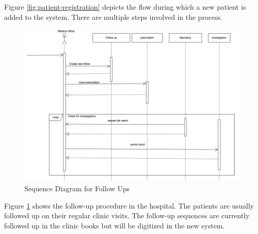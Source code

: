 \documentclass[12pt,a4paper]{report}
\begin{document}
Figure \ref{fig:patient-registration} depicts the flow during which a new patient is added to the system. There are multiple steps involved in the process. 
 
 
\newpage 
 
 \begin{figure}[hbp]
\begin{center}
\includegraphics[width=\textwidth]{images/followups.png}	
\end{center}
\caption{Sequence Diagram for Follow Ups}
\label{fig:patient-followups}
\end{figure}

Figure \ref{fig:patient-followups} shows the follow-up procedure in the hospital.  The patients are usually followed up on their regular clinic visits. The follow-up sequences are currently followed up in the clinic books but will be digitized in the new system.

\newpage
 
\end{document}
